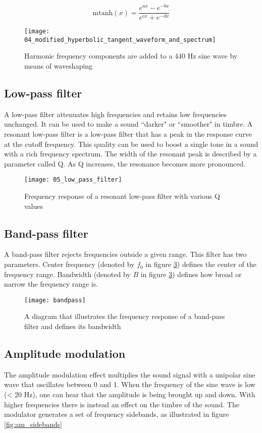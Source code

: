 $$\text{mtanh}(x)=\frac{e^{ax}-e^{-bx}}{e^{cx}+e^{-dx}}$$

\begin{figure}[h]
    \centering
    \texttt{[image: 04\_modified\_hyperbolic\_tangent\_waveform\_and\_spectrum]}
    \caption{Harmonic frequency components are added to a 440 Hz sine wave by means of waveshaping}
    \label{fig:modified_hyperbolic_tangent_waveform_and_spectrum}
\end{figure}

\subsection{Low-pass filter}
A low-pass filter attenuates high frequencies and retains low frequencies unchanged. It can be used to make a sound ``darker" or ``smoother" in timbre. A resonant low-pass filter is a low-pass filter that has a peak in the response curve at the cutoff frequency. This quality can be used to boost a single tone in a sound with a rich frequency spectrum. The width of the resonant peak is described by a parameter called Q. As Q increases, the resonance becomes more pronounced.

\begin{figure}[h]
    \centering
    \texttt{[image: 05\_low\_pass\_filter]}
    \caption{Frequency response of a resonant low-pass filter with various Q values}
    \label{fig:low_pass_filter}
\end{figure}

\subsection{Band-pass filter}
A band-pass filter rejects frequencies outside a given range. This filter has two parameters. Center frequency (denoted by $f_0$ in figure \ref{fig:bandpass}) defines the center of the frequency range. Bandwidth (denoted by $B$ in figure \ref{fig:bandpass}) defines how broad or narrow the frequency range is.

\begin{figure}[h]
    \centering
    \texttt{[image: bandpass]}
    \caption{A diagram that illustrates the frequency response of a band-pass filter and defines its bandwidth}
    \label{fig:bandpass}
\end{figure}

\subsection{Amplitude modulation}
The amplitude modulation effect multiplies the sound signal with a unipolar sine wave that oscillates between 0 and 1. When the frequency of the sine wave is low (< 20 Hz), one can hear that the amplitude is being brought up and down. With higher frequencies there is instead an effect on the timbre of the sound. The modulator generates a set of frequency sidebands, as illustrated in figure \ref{fig:am_sidebands}

